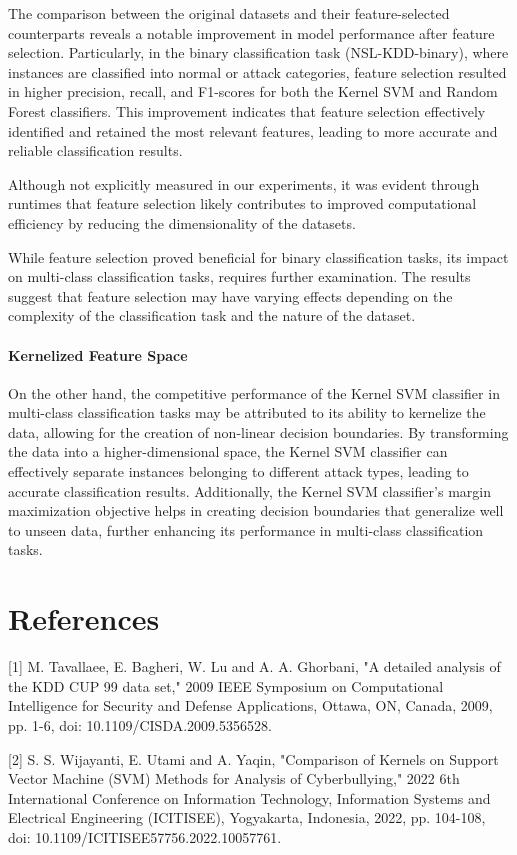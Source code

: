 \documentclass{article}
\begin{document}
The comparison between the original datasets and their feature-selected counterparts reveals a notable improvement in model performance after feature selection. Particularly, in the binary classification task (NSL-KDD-binary), where instances are classified into normal or attack categories, feature selection resulted in higher precision, recall, and F1-scores for both the Kernel SVM and Random Forest classifiers. This improvement indicates that feature selection effectively identified and retained the most relevant features, leading to more accurate and reliable classification results.

Although not explicitly measured in our experiments, it was evident through runtimes that feature selection likely contributes to improved computational efficiency by reducing the dimensionality of the datasets.

While feature selection proved beneficial for binary classification tasks, its impact on multi-class classification tasks, requires further examination. The results suggest that feature selection may have varying effects depending on the complexity of the classification task and the nature of the dataset. 

\paragraph{Kernelized Feature Space}

On the other hand, the competitive performance of the Kernel SVM classifier in multi-class classification tasks may be attributed to its ability to kernelize the data, allowing for the creation of non-linear decision boundaries. By transforming the data into a higher-dimensional space, the Kernel SVM classifier can effectively separate instances belonging to different attack types, leading to accurate classification results. Additionally, the Kernel SVM classifier's margin maximization objective helps in creating decision boundaries that generalize well to unseen data, further enhancing its performance in multi-class classification tasks.


\section*{References}

{
\small
[1] M. Tavallaee, E. Bagheri, W. Lu and A. A. Ghorbani, "A detailed analysis of the KDD CUP 99 data set," 2009 IEEE Symposium on Computational Intelligence for Security and Defense Applications, Ottawa, ON, Canada, 2009, pp. 1-6, doi: 10.1109/CISDA.2009.5356528.

[2] S. S. Wijayanti, E. Utami and A. Yaqin, "Comparison of Kernels on Support Vector Machine (SVM) Methods for Analysis of Cyberbullying," 2022 6th International Conference on Information Technology, Information Systems and Electrical Engineering (ICITISEE), Yogyakarta, Indonesia, 2022, pp. 104-108, doi: 10.1109/ICITISEE57756.2022.10057761.
}

\end{document}
